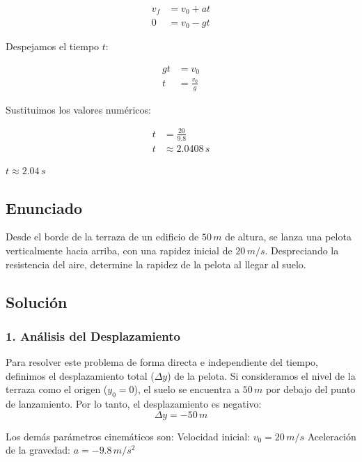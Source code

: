 \documentclass[12pt, a4paper]{article}
\begin{document}
\begin{align*}
v_f &= v_0 + a t \\
0 &= v_0 - g t
\end{align*}

Despejamos el tiempo $t$:

\begin{align*}
g t &= v_0 \\
t &= \frac{v_0}{g}
\end{align*}

Sustituimos los valores numéricos:

\begin{align*}
t &= \frac{20}{9.8} \\
t &\approx 2.0408 \, \si{s}
\end{align*}

\begin{tcolorbox}[colback=green!5!white, colframe=green!50!black, title=Respuesta Final]
\centering \Large $t \approx 2.04 \, \si{s}$
\end{tcolorbox}

\newpage

\subsection*{Enunciado}
Desde el borde de la terraza de un edificio de $50 \, \si{m}$ de altura, se lanza una pelota verticalmente hacia arriba, con una rapidez inicial de $20 \, \si{m/s}$. Despreciando la resistencia del aire, determine la rapidez de la pelota al llegar al suelo.

\subsection*{Solución}

\subsubsection*{1. Análisis del Desplazamiento}
Para resolver este problema de forma directa e independiente del tiempo, definimos el desplazamiento total ($\Delta y$) de la pelota. 
Si consideramos el nivel de la terraza como el origen ($y_0 = 0$), el suelo se encuentra a $50 \, \si{m}$ por debajo del punto de lanzamiento. Por lo tanto, el desplazamiento es negativo:
$$ \Delta y = -50 \, \si{m} $$

Los demás parámetros cinemáticos son:
Velocidad inicial: $v_0 = 20 \, \si{m/s}$
Aceleración de la gravedad: $a = -9.8 \, \si{m/s^2}$
\end{document}
